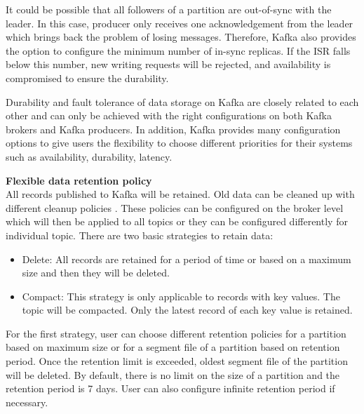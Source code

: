 It could be possible that all followers of a partition are out-of-sync with the leader. In this case, producer only receives one acknowledgement from the leader which brings back the problem of losing messages. Therefore, Kafka also provides the option to configure the minimum number of in-sync replicas. If the ISR falls below this number, new writing requests will be rejected, and availability is compromised to ensure the durability.

Durability and fault tolerance of data storage on Kafka are closely related to each other and can only be achieved with the right configurations on both Kafka brokers and Kafka producers. In addition, Kafka provides many configuration options to give users the flexibility to choose different priorities for their systems such as availability, durability, latency. 

\textbf{Flexible data retention policy}\\
All records published to Kafka will be retained. Old data can be cleaned up with different cleanup policies \cite{kafkaconfigurationtopic}. These policies can be configured on the broker level which will then be applied to all topics or they can be configured differently for individual topic. There are two basic strategies to retain data:
\begin{itemize}
	\item Delete: All records are retained for a period of time or based on a maximum size and then they will be deleted.
	\item Compact: This strategy is only applicable to records with key values. The topic will be compacted. Only the latest record of each key value is retained.
\end{itemize}

For the first strategy, user can choose different retention policies for a partition based on maximum size or for a segment file of a partition based on retention period. Once the retention limit is exceeded, oldest segment file of the partition will be deleted. By default, there is no limit on the size of a partition and the retention period is 7 days. User can also configure infinite retention period if necessary.

